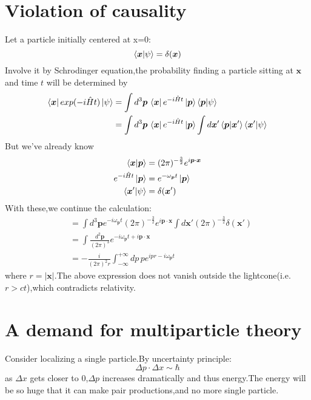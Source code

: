 \documentclass[a4paper]{article}
\begin{document}
	\section{Violation of causality}
	Let a particle initially centered at x=0:$$\braket{\bm{x}|\psi}=\delta(\bm{x})$$Involve it by Schrodinger equation,the probability finding a particle sitting at $\bm{x}$ and time $t$ will be determined by
	\begin{align*}
		\bra{\bm{x}}exp(-i\hat{H}t)\ket{\psi}&=\int d^3\bm{p}\,\bra{\bm{x}}e^{-i\hat{H}t}\ket{\bm{p}}\braket{\bm{p}|\psi}\\
		&=\int d^3\bm{p}\,\bra{\bm{x}}e^{-i\hat{H}t}\ket{\bm{p}}\int d\bm{x}'\braket{\bm{p}|\bm{x}'}\braket{\bm{x}'|\psi}
	\end{align*}
	But we've already know
	\begin{align*}
		\braket{\bm{x}|\bm{p}}&=(2\pi)^{-\frac{3}{2}}e^{i\bm{p}\cdot\bm{x}}\\
		e^{-i\hat{H}t}\ket{\bm{p}}&=e^{-\omega_{\bm{p}}t}\ket{\bm{p}}\\
		\braket{\bm{x}'|\psi}&=\delta(\bm{x}')
	\end{align*}
	With these,we continue the calculation:
	\begin{align*}
		&=\int d^3\bm{p}e^{-i\omega_{\bm{p}}t}(2\pi)^{-\frac{3}{2}}e^{i\bm{p}\cdot\bm{x}}\int d\bm{x}'(2\pi)^{-\frac{3}{2}}\delta(\bm{x}')\\
		&=\int \frac{d^2\bm{p}}{(2\pi)^3}e^{-i\omega_{\bm{p}}t+i\bm{p}\cdot\bm{x}}\\
		&=-\frac{i}{(2\pi)^2r}\int_{-\infty}^{+\infty}dp\,pe^{ipr-i\omega_{\bm{p}}t}
	\end{align*}
	where $r=|\bm{x}|$.The above expression does not vanish outside the lightcone(i.e. $r>ct$),which contradicts relativity.
	\section{A demand for multiparticle theory}
	Consider localizing a single particle.By uncertainty principle:$$\Delta p\cdot\Delta x\sim\hbar$$as $\Delta x$ gets closer to 0,$\Delta p$ increases dramatically and thus energy.The energy will be so huge that it can make pair productions,and no more single particle.
\end{document}
